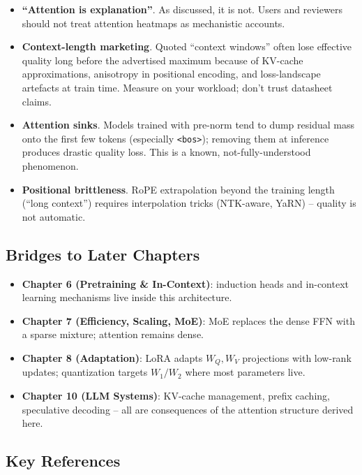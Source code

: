 \begin{itemize}
  \item \textbf{``Attention is explanation''}. As discussed, it is
        not. Users and reviewers should not treat attention heatmaps
        as mechanistic accounts.
  \item \textbf{Context-length marketing}. Quoted ``context windows''
        often lose effective quality long before the advertised
        maximum because of KV-cache approximations, anisotropy in
        positional encoding, and loss-landscape artefacts at train
        time. Measure on your workload; don't trust datasheet claims.
  \item \textbf{Attention sinks}. Models trained with pre-norm tend
        to dump residual mass onto the first few tokens (especially
        \texttt{<bos>}); removing them at inference produces drastic
        quality loss. This is a known, not-fully-understood phenomenon.
  \item \textbf{Positional brittleness}. RoPE extrapolation beyond the
        training length (``long context'') requires interpolation
        tricks (NTK-aware, YaRN) -- quality is not automatic.
\end{itemize}

\subsection{Bridges to Later Chapters}

\begin{itemize}
  \item \textbf{Chapter 6 (Pretraining \& In-Context)}: induction heads
        and in-context learning mechanisms
        \citep{olsson2022induction, xie2022explanation} live inside
        this architecture.
  \item \textbf{Chapter 7 (Efficiency, Scaling, MoE)}: MoE replaces the
        dense FFN with a sparse mixture; attention remains dense.
  \item \textbf{Chapter 8 (Adaptation)}: LoRA adapts $W_Q, W_V$ projections
        with low-rank updates; quantization targets $W_1/W_2$ where
        most parameters live.
  \item \textbf{Chapter 10 (LLM Systems)}: KV-cache management, prefix
        caching, speculative decoding -- all are consequences of the
        attention structure derived here.
\end{itemize}

\subsection{Key References}

